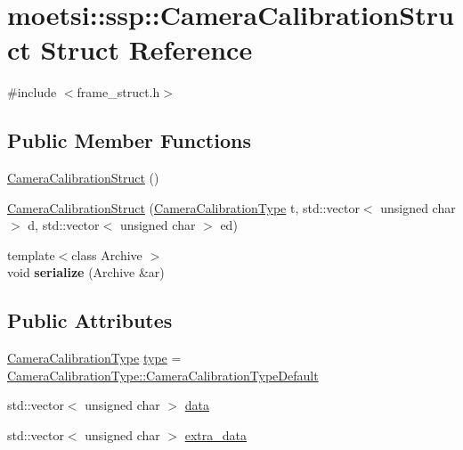 \hypertarget{structmoetsi_1_1ssp_1_1CameraCalibrationStruct}{}\section{moetsi\+:\+:ssp\+:\+:Camera\+Calibration\+Struct Struct Reference}
\label{structmoetsi_1_1ssp_1_1CameraCalibrationStruct}


{\ttfamily \#include $<$frame\+\_\+struct.\+h$>$}

\subsection*{Public Member Functions}
\begin{DoxyCompactItemize}
\item 
\hyperlink{structmoetsi_1_1ssp_1_1CameraCalibrationStruct_a5571f80a7f6136c795fde444eef1d015}{Camera\+Calibration\+Struct} ()
\item 
\hyperlink{structmoetsi_1_1ssp_1_1CameraCalibrationStruct_afda542a87cb4e84eb1af89763f3d2c3c}{Camera\+Calibration\+Struct} (\hyperlink{namespacemoetsi_1_1ssp_a1f51291db51233dc5865d42e6ee36ef8}{Camera\+Calibration\+Type} t, std\+::vector$<$ unsigned char $>$ d, std\+::vector$<$ unsigned char $>$ ed)
\item 
\mbox{\label{structmoetsi_1_1ssp_1_1CameraCalibrationStruct_aec1417ffc77fb72c19a40e9b82b157b9}} 
{\footnotesize template$<$class Archive $>$ }\\void {\bfseries serialize} (Archive \&ar)
\end{DoxyCompactItemize}
\subsection*{Public Attributes}
\begin{DoxyCompactItemize}
\item 
\hyperlink{namespacemoetsi_1_1ssp_a1f51291db51233dc5865d42e6ee36ef8}{Camera\+Calibration\+Type} \hyperlink{structmoetsi_1_1ssp_1_1CameraCalibrationStruct_a1ca6c9353a0523a437fe2318d560f39a}{type} = \hyperlink{namespacemoetsi_1_1ssp_a1f51291db51233dc5865d42e6ee36ef8ac32f0bb1b309dd3992d8e37bfaa00c78}{Camera\+Calibration\+Type\+::\+Camera\+Calibration\+Type\+Default}
\item 
std\+::vector$<$ unsigned char $>$ \hyperlink{structmoetsi_1_1ssp_1_1CameraCalibrationStruct_a92a4d9b317af80ed9972c8f206857cbf}{data}
\item 
std\+::vector$<$ unsigned char $>$ \hyperlink{structmoetsi_1_1ssp_1_1CameraCalibrationStruct_af95845197acc5b1034ff9f1d1f11d7ce}{extra\+\_\+data}
\end{DoxyCompactItemize}


